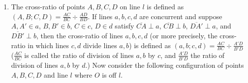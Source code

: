 \documentclass[a4paper,11pt]{article}
\newcommand{\ds}{\displaystyle}
\begin{document}
{{\begin{enumerate}[leftmargin=*]
		\item The cross-ratio of points $\ds{A, B, C, D}$ on line $\ds{l}$ is defined as ${(A, B; C, D) = \frac{AC}{BC} \div \frac{AD}{BD}}$. If lines $\ds{a, b, c, d}$ are concurrent and suppose $\ds{A, A' \in a}$, $\ds{B, B' \in b}$, $\ds{C \in c}$, $\ds{D \in d}$ satisfy $\ds{\overline{CA} \perp a}$, $\ds{\overline{CB} \perp b}$, $\ds{\overline{DA'} \perp a}$, and $\ds{\overline{DB'} \perp b}$, then the cross-ratio of lines $\ds{a, b, c, d}$ (or more precisely, the cross-ratio in which lines $\ds{c, d}$ divide lines $\ds{a, b}$) is defined as ${(a, b; c, d) = \frac{AC}{BC} \div \frac{A'D}{B'D}}$ (${\frac{AC}{BC}}$ is called the ratio of division of lines $\ds{a, b}$ by $\ds{c}$, and ${\frac{A'D}{B'D}}$ the ratio of division of lines $\ds{a, b}$ by $\ds{d}$.) Now consider the following configuration of points $\ds{A, B, C, D}$ and line $\ds{l}$ where $\ds{O}$ is off $\ds{l}$.
			
	\begin{center}
	\end{center}


\end{enumerate}}}
\end{document}
